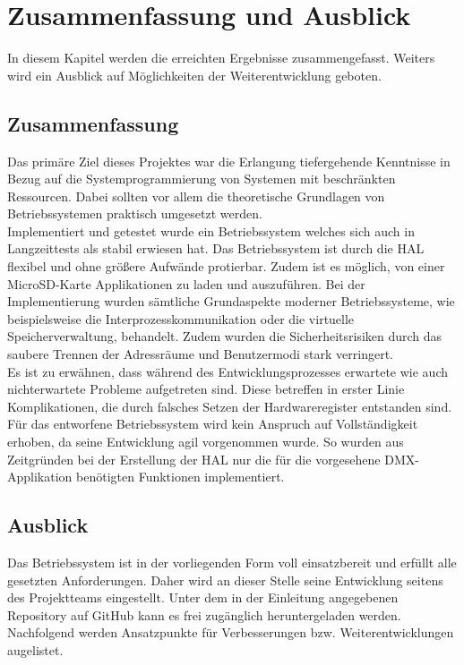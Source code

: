 \section{Zusammenfassung und Ausblick}

In diesem Kapitel werden die erreichten Ergebnisse zusammengefasst. Weiters wird ein Ausblick auf Möglichkeiten der Weiterentwicklung geboten.

\subsection{Zusammenfassung}

Das primäre Ziel dieses Projektes war die Erlangung tiefergehende Kenntnisse in Bezug auf die Systemprogrammierung von Systemen mit beschränkten Ressourcen. Dabei sollten vor allem die theoretische Grundlagen von Betriebssystemen praktisch umgesetzt werden. \\
 
Implementiert und getestet wurde ein Betriebssystem welches sich auch in Langzeittests als stabil erwiesen hat. Das Betriebssystem ist durch die HAL flexibel und ohne größere Aufwände protierbar. Zudem ist es möglich, von einer MicroSD-Karte Applikationen zu laden und auszuführen. 
Bei der Implementierung wurden sämtliche Grundaspekte moderner Betriebssysteme, wie beispielsweise die Interprozesskommunikation oder die virtuelle Speicherverwaltung, behandelt. Zudem wurden die Sicherheitsrisiken durch das saubere Trennen der Adressräume und Benutzermodi stark verringert. \\
 
Es ist zu erwähnen, dass während des Entwicklungsprozesses erwartete wie auch nichterwartete Probleme aufgetreten sind. Diese betreffen in erster Linie Komplikationen, die durch falsches Setzen der Hardwareregister entstanden sind. \\
 
Für das entworfene Betriebssystem wird kein Anspruch auf Vollständigkeit erhoben, da seine Entwicklung agil vorgenommen wurde. So wurden aus Zeitgründen bei der Erstellung der HAL nur die für die vorgesehene DMX-Applikation benötigten Funktionen implementiert. \\
 

\subsection{Ausblick}

Das Betriebssystem ist in der vorliegenden Form voll einsatzbereit und erfüllt alle gesetzten Anforderungen. Daher wird an dieser Stelle seine Entwicklung seitens des Projektteams eingestellt. Unter dem in der Einleitung angegebenen Repository auf GitHub kann es frei zugänglich heruntergeladen werden. Nachfolgend werden Ansatzpunkte für Verbesserungen bzw. Weiterentwicklungen augelistet.

